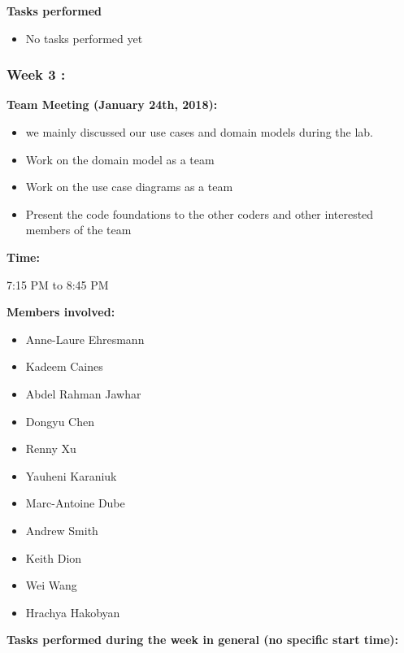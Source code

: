 \documentclass[11pt]{article}
\begin{document}
\textbf{Tasks performed}
\begin{itemize}
    \item No tasks performed yet
\end{itemize}



\subsubsection{Week 3 :}


\textbf{Team Meeting (January 24th, 2018):}
\begin{itemize}
    \item we mainly discussed our use cases and domain models during the lab.
    \item Work on the domain model as a team
    \item Work on the use case diagrams as a team
    \item Present the code foundations to the other coders and other interested members of the team
\end{itemize}

\textbf{Time:}

7:15 PM to 8:45 PM

\textbf{Members involved:}

\begin{itemize}
    \item Anne-Laure	Ehresmann
    \item Kadeem	Caines
\item Abdel Rahman	Jawhar
\item Dongyu	Chen
\item Renny	Xu
\item Yauheni	Karaniuk
\item Marc-Antoine	Dube
\item Andrew	Smith
\item  Keith	Dion
\item   Wei	Wang
\item Hrachya	Hakobyan
\end{itemize}

\textbf{Tasks performed during the week in general (no specific start time):}
\end{document}
